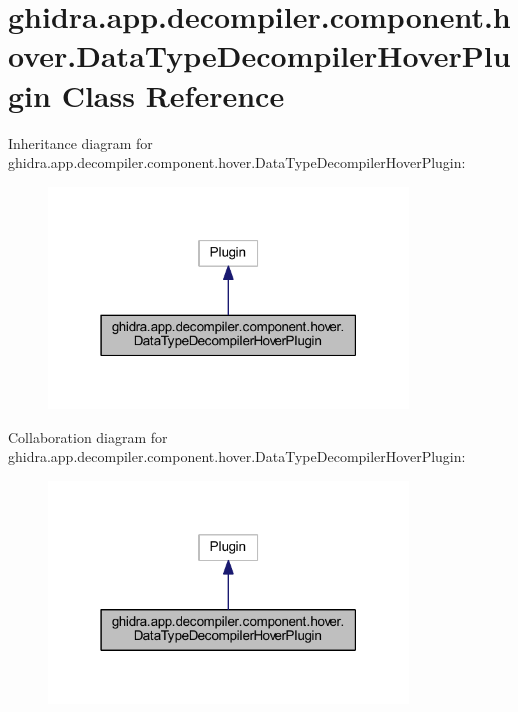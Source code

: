 \hypertarget{classghidra_1_1app_1_1decompiler_1_1component_1_1hover_1_1_data_type_decompiler_hover_plugin}{}\section{ghidra.\+app.\+decompiler.\+component.\+hover.\+Data\+Type\+Decompiler\+Hover\+Plugin Class Reference}
\label{classghidra_1_1app_1_1decompiler_1_1component_1_1hover_1_1_data_type_decompiler_hover_plugin}


Inheritance diagram for ghidra.\+app.\+decompiler.\+component.\+hover.\+Data\+Type\+Decompiler\+Hover\+Plugin\+:
\nopagebreak
\begin{figure}[H]
\begin{center}
\leavevmode
\includegraphics[width=271pt]{classghidra_1_1app_1_1decompiler_1_1component_1_1hover_1_1_data_type_decompiler_hover_plugin__inherit__graph}
\end{center}
\end{figure}


Collaboration diagram for ghidra.\+app.\+decompiler.\+component.\+hover.\+Data\+Type\+Decompiler\+Hover\+Plugin\+:
\nopagebreak
\begin{figure}[H]
\begin{center}
\leavevmode
\includegraphics[width=271pt]{classghidra_1_1app_1_1decompiler_1_1component_1_1hover_1_1_data_type_decompiler_hover_plugin__coll__graph}
\end{center}
\end{figure}
